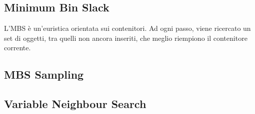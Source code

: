 \documentclass{article}
\begin{document}
\subsection{Minimum Bin Slack}
L'MBS è un'euristica orientata sui contenitori. Ad ogni passo, viene ricercato un set di oggetti, tra quelli non ancora inseriti, che meglio riempiono il contenitore corrente.

\subsection{MBS Sampling}

\subsection{Variable Neighbour Search}



\end{document}
